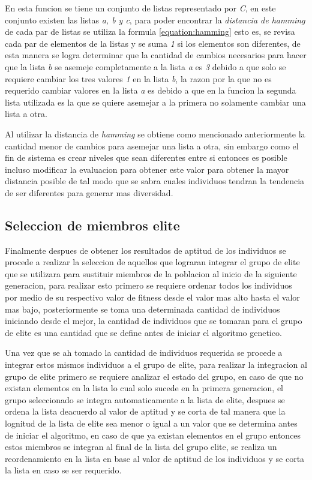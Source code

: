 En esta funcion se tiene un conjunto de listas representado por \textit{C}, en
este conjunto existen las listas \textit{a, b y c}, para poder encontrar la
\textit{distancia de hamming} de cada par de listas se utiliza la formula
\ref{equation:hamming} esto es, se revisa cada par de elementos de la listas y
se suma \textit{1} si los elementos son diferentes, de esta manera se logra
determinar que la cantidad de cambios necesarios para hacer que la lista
\textit{b} se asemeje completamente a la lista \textit{a} es \textit{3} debido a
que solo se requiere cambiar los tres valores \textit{1} en la lista \textit{b},
la razon por la que no es requerido cambiar valores en la lista \textit{a} es
debido a que en la funcion la segunda lista utilizada es la que se quiere
asemejar a la primera no solamente cambiar una lista a otra.

Al utilizar la distancia de \textit{hamming} se obtiene como mencionado
anteriormente la cantidad menor de cambios para asemejar una lista a otra, sin
embargo como el fin de sistema es crear niveles que sean diferentes entre si
entonces es posible incluso modificar la evaluacion para obtener este valor para
obtener la mayor distancia posible de tal modo que se sabra cuales individuos
tendran la tendencia de ser diferentes para generar mas diversidad.

\subsection{Seleccion de miembros elite}
\label{subsection:elite_selection}

Finalmente despues de obtener los resultados de aptitud de los individuos se
procede a realizar la seleccion de aquellos que lograran integrar el grupo de
elite que se utilizara para sustituir miembros de la poblacion al inicio de la
siguiente generacion, para realizar esto primero se requiere ordenar todos los
individuos por medio de su respectivo valor de fitness desde el valor mas alto
hasta el valor mas bajo, posteriormente se toma una determinada cantidad de
individuos iniciando desde el mejor, la cantidad de individuos que se tomaran
para el grupo de elite es una cantidad que se define antes de iniciar el
algoritmo genetico.

Una vez que se ah tomado la cantidad de individuos requerida se procede a
integrar estos mismos individuos a el grupo de elite, para realizar la
integracion al grupo de elite primero se requiere analizar el estado del grupo,
en caso de que no existan elementos en la lista lo cual solo sucede en la
primera generacion, el grupo seleccionado se integra automaticamente a la lista
de elite, despues se ordena la lista deacuerdo al valor de aptitud y se corta de
tal manera que la lognitud de la lista de elite sea menor o igual a un valor que
se determina antes de iniciar el algoritmo, en caso de que ya existan elementos
en el grupo entonces estos miembros se integran al final de la lista del grupo
elite, se realiza un reordenamiento en la lista en base al valor de aptitud de
los individuos y se corta la lista en caso se ser requerido.

